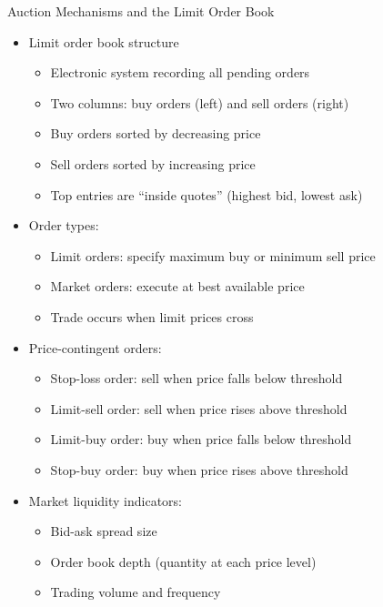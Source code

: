 \documentclass[10pt]{beamer}
\begin{document}
\begin{frame}{Auction Mechanisms and the Limit Order Book}
  \begin{itemize}[<+->]
    \item Limit order book structure
      \begin{itemize}
        \item Electronic system recording all pending orders
        \item Two columns: buy orders (left) and sell orders (right)
        \item Buy orders sorted by decreasing price
        \item Sell orders sorted by increasing price
        \item Top entries are ``inside quotes'' (highest bid, lowest ask)
      \end{itemize}
    \item Order types:
      \begin{itemize}
        \item Limit orders: specify maximum buy or minimum sell price
        \item Market orders: execute at best available price
        \item Trade occurs when limit prices cross
      \end{itemize}
    \item Price-contingent orders:
      \begin{itemize}
        \item Stop-loss order: sell when price falls below threshold
        \item Limit-sell order: sell when price rises above threshold
        \item Limit-buy order: buy when price falls below threshold
        \item Stop-buy order: buy when price rises above threshold
      \end{itemize}
    \item Market liquidity indicators:
      \begin{itemize}
        \item Bid-ask spread size
        \item Order book depth (quantity at each price level)
        \item Trading volume and frequency
      \end{itemize}
  \end{itemize}
\end{frame}
\end{document}
